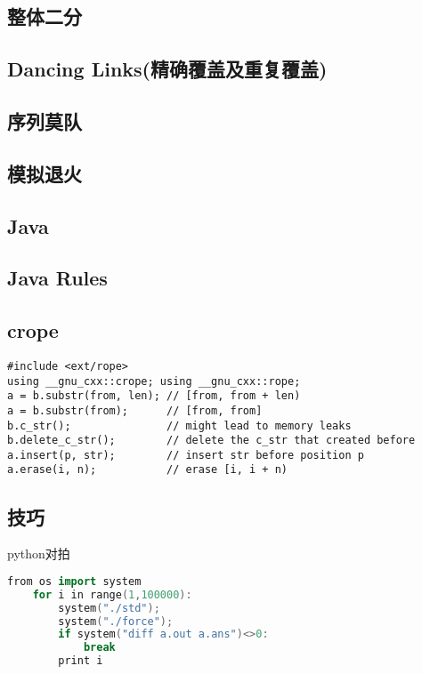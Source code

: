 \documentclass[landscape,a4paper]{article}
\begin{document}
\begin{spacing}{0.3}
\begin{multicols}{3}
		\subsection{整体二分}
		
		\subsection{Dancing Links(精确覆盖及重复覆盖)}
		
		\subsection{序列莫队}
		
		\subsection{模拟退火}
		
		\subsection{Java}
		
	\subsection{Java Rules}
	

	\subsection{crope}
	\begin{lstlisting}
#include <ext/rope>
using __gnu_cxx::crope; using __gnu_cxx::rope;
a = b.substr(from, len); // [from, from + len)
a = b.substr(from);      // [from, from]
b.c_str();               // might lead to memory leaks
b.delete_c_str();        // delete the c_str that created before
a.insert(p, str);        // insert str before position p
a.erase(i, n);           // erase [i, i + n)

	\end{lstlisting}	
	\end{multicols}

	\begin{multicols}{2}%

	

\section{技巧}
python对拍
\begin{lstlisting}[language=C++]
from os import system
	for i in range(1,100000):
		system("./std");
		system("./force");
		if system("diff a.out a.ans")<>0:
            break
		print i
\end{lstlisting}


\end{multicols}
\end{spacing}
\end{document}
